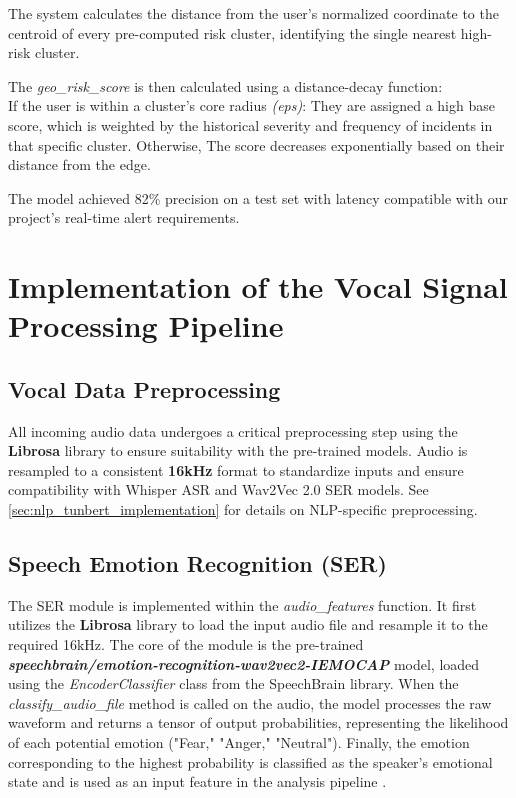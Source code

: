 \documentclass[12pt,a4paper,oneside,english]{book}
\begin{document}
The system calculates the distance from the user's normalized coordinate to the centroid of every pre-computed risk cluster, identifying the single nearest high-risk cluster.

The \textit{geo\_risk\_score} is then calculated using a distance-decay function:
\\If the user is within a cluster's core radius \textit{(eps)}: They are assigned a high base score, which is weighted by the historical severity and frequency of incidents in that specific cluster. Otherwise, The  score decreases exponentially based on their distance from the edge.

The model achieved 82\% precision on a test set with latency compatible with our project's real-time alert requirements.

\section{Implementation of the Vocal Signal Processing Pipeline}
\label{sec:vocal_pipeline_implementation}

\subsection{Vocal Data Preprocessing}
\label{sec:vocal_preprocess}
All incoming audio data undergoes a critical preprocessing step using the \textbf{Librosa} library to ensure suitability with the pre-trained models.  
Audio is resampled to a consistent \textbf{16kHz} format to standardize inputs and ensure compatibility with Whisper ASR and Wav2Vec 2.0 SER models.  
See \ref{sec:nlp_tunbert_implementation} for details on NLP-specific preprocessing.

\subsection{Speech Emotion Recognition (SER)}
\label{subsec:ser_implementation}
The SER module is implemented within the \textit{audio\_features} function. It first utilizes the \textbf{Librosa} library to load the input audio file and resample it to the required 16kHz. 
The core of the module is the pre-trained \textbf{\textit{speechbrain/emotion-recognition-wav2vec2-IEMOCAP}} model, loaded using the \textit{EncoderClassifier} class from the SpeechBrain library. 
 When the \textit{classify\_audio\_file} method is called on the audio, the model processes the raw waveform and returns a tensor of output probabilities, representing the likelihood of each potential emotion ("Fear," "Anger," "Neutral").
Finally, the emotion corresponding to the highest probability is classified as the speaker's emotional state and is used as an input feature in the analysis pipeline .
\end{document}
